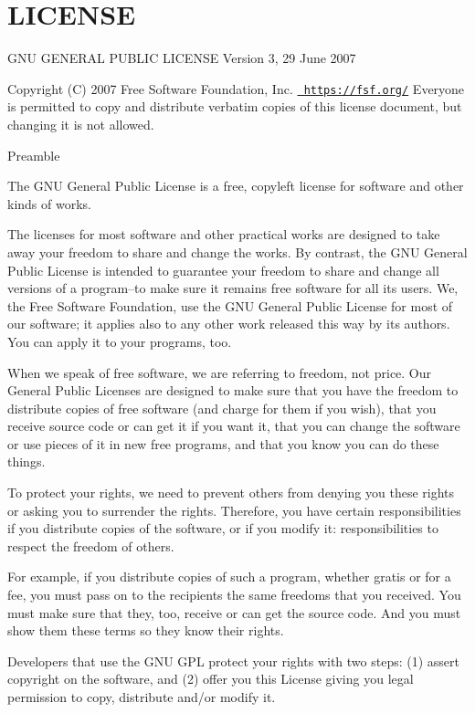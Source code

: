 \chapter{LICENSE}
\hypertarget{md_BCI2000RemoteNET_2LICENSE}{}\label{md_BCI2000RemoteNET_2LICENSE}
GNU GENERAL PUBLIC LICENSE Version 3, 29 June 2007

Copyright (C) 2007 Free Software Foundation, Inc. \href{https://fsf.org/}{\texttt{ https\+://fsf.\+org/}} Everyone is permitted to copy and distribute verbatim copies of this license document, but changing it is not allowed. \begin{DoxyVerb}                       Preamble
\end{DoxyVerb}
 The GNU General Public License is a free, copyleft license for software and other kinds of works.

The licenses for most software and other practical works are designed to take away your freedom to share and change the works. By contrast, the GNU General Public License is intended to guarantee your freedom to share and change all versions of a program--to make sure it remains free software for all its users. We, the Free Software Foundation, use the GNU General Public License for most of our software; it applies also to any other work released this way by its authors. You can apply it to your programs, too.

When we speak of free software, we are referring to freedom, not price. Our General Public Licenses are designed to make sure that you have the freedom to distribute copies of free software (and charge for them if you wish), that you receive source code or can get it if you want it, that you can change the software or use pieces of it in new free programs, and that you know you can do these things.

To protect your rights, we need to prevent others from denying you these rights or asking you to surrender the rights. Therefore, you have certain responsibilities if you distribute copies of the software, or if you modify it\+: responsibilities to respect the freedom of others.

For example, if you distribute copies of such a program, whether gratis or for a fee, you must pass on to the recipients the same freedoms that you received. You must make sure that they, too, receive or can get the source code. And you must show them these terms so they know their rights.

Developers that use the GNU GPL protect your rights with two steps\+: (1) assert copyright on the software, and (2) offer you this License giving you legal permission to copy, distribute and/or modify it.

